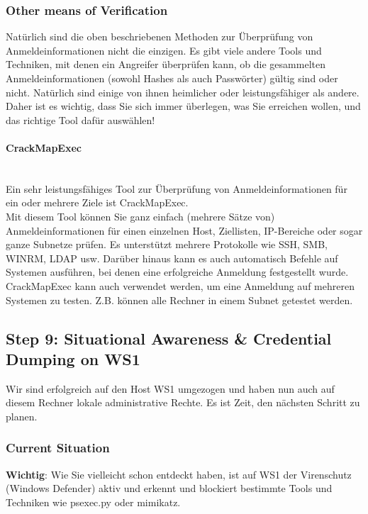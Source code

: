 \subsubsection{Other means of Verification}
Natürlich sind die oben beschriebenen Methoden zur Überprüfung von Anmeldeinformationen nicht die einzigen. Es gibt viele andere Tools und Techniken, mit denen ein Angreifer überprüfen kann, ob die gesammelten Anmeldeinformationen (sowohl Hashes als auch Passwörter) gültig sind oder nicht. Natürlich sind einige von ihnen heimlicher oder leistungsfähiger als andere. Daher ist es wichtig, dass Sie sich immer überlegen, was Sie erreichen wollen, und das richtige Tool dafür auswählen!

\paragraph{CrackMapExec}\mbox{} \\
Ein sehr leistungsfähiges Tool zur Überprüfung von Anmeldeinformationen für ein oder mehrere Ziele ist CrackMapExec.\\

Mit diesem Tool können Sie ganz einfach (mehrere Sätze von) Anmeldeinformationen für einen einzelnen Host, Ziellisten, IP-Bereiche oder sogar ganze Subnetze prüfen. Es unterstützt mehrere Protokolle wie SSH, SMB, WINRM, LDAP usw. Darüber hinaus kann es auch automatisch Befehle auf Systemen ausführen, bei denen eine erfolgreiche Anmeldung festgestellt wurde.\\

CrackMapExec kann auch verwendet werden, um eine Anmeldung auf mehreren Systemen zu testen. Z.B. können alle Rechner in einem Subnet getestet werden.



\subsection{Step 9: Situational Awareness \& Credential Dumping on WS1}
Wir sind erfolgreich auf den Host WS1 umgezogen und haben nun auch auf diesem Rechner lokale administrative Rechte. Es ist Zeit, den nächsten Schritt zu planen.

\subsubsection{Current Situation}
\textbf{Wichtig}: Wie Sie vielleicht schon entdeckt haben, ist auf WS1 der Virenschutz (Windows Defender) aktiv und erkennt und blockiert bestimmte Tools und Techniken wie psexec.py oder mimikatz.

